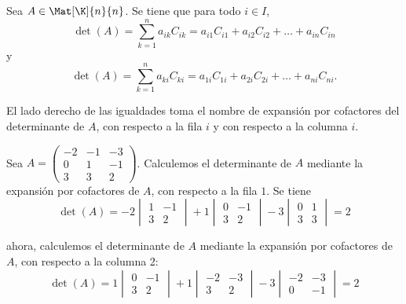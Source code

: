 \documentclass[compacto,10pt]{pubciencias-notas}
\begin{document}

\begin{teo}
    Sea $A \in \Mat[\K]{n}{n}$. Se tiene que para todo $i\in I$,
    \[
        \det(A) 
        = \sum_{k=1}^n a_{ik}C_{ik} 
        = a_{i1}C_{i1} + a_{i2}C_{i2} + \ldots + a_{in}C_{in}
    \]
    y
    \[
        \det(A) 
        = \sum_{k=1}^n a_{ki}C_{ki} 
        = a_{1i}C_{1i} + a_{2i}C_{2i} + \ldots + a_{ni}C_{ni}.
    \]
\end{teo}

\begin{advertencia}
    El lado derecho de las igualdades toma el nombre de expansión por cofactores del determinante de $A$, con respecto a la fila $i$ y con respecto a la columna $i$.
\end{advertencia}

\begin{ejem}\hspace{0pt}\label{Det_Ej1}
    Sea $A =
    \begin{pmatrix}
        -2 & -1 & -3 \\
        0 & 1 & -1 \\
        3 & 3 & 2
    \end{pmatrix}$.
    \noindent Calculemos el determinante de $A$ mediante la expansión por cofactores de $A$, con respecto a la fila $1$. Se tiene
    \[
        \det(A) = -2 
        \begin{vmatrix}
            1 & -1 \\
            3 & 2
        \end{vmatrix} +1
        \begin{vmatrix}
            0 & -1 \\
            3 & 2
        \end{vmatrix} -3
        \begin{vmatrix}
            0 & 1 \\
            3 & 3
        \end{vmatrix} = 2
    \]
    
    ahora, calculemos el determinante de $A$ mediante la expansión por cofactores de $A$, con respecto a la columna 2:
    \[
        \det(A) = 1 
        \begin{vmatrix}
            0 & -1 \\
            3 & 2
        \end{vmatrix} +1
        \begin{vmatrix}
            -2 & -3 \\
            3 & 2
        \end{vmatrix} -3
        \begin{vmatrix}
            -2 & -3 \\
            0 & -1
        \end{vmatrix} = 2
    \]
    
    \end{ejem}
    
\end{document}

